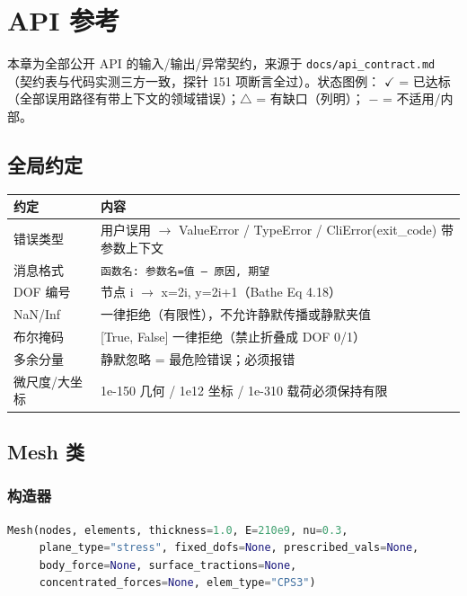 \documentclass[12pt,a4paper]{ctexart}
\newcommand{\fem}{\Verb}
\begin{document}
\section{API 参考}

本章为全部公开 API 的输入/输出/异常契约，来源于 \fem|docs/api_contract.md|
（契约表与代码实测三方一致，探针 151 项断言全过）。状态图例：
$\checkmark$ = 已达标（全部误用路径有带上下文的领域错误）；$\triangle$ = 有缺口（列明）；
$-$ = 不适用/内部。

\subsection{全局约定}

\begin{longtable}{p{3.0cm}p{11.8cm}}
\toprule
\textbf{约定} & \textbf{内容} \\
\midrule
错误类型 & 用户误用 $\to$ ValueError / TypeError / CliError(exit\_code) 带参数上下文 \\
消息格式 & \fem|函数名: 参数名=值 — 原因, 期望| \\
DOF 编号 & 节点 i $\to$ x=2i, y=2i+1（Bathe Eq 4.18） \\
NaN/Inf & 一律拒绝（有限性），不允许静默传播或静默夹值 \\
布尔掩码 & [True, False] 一律拒绝（禁止折叠成 DOF 0/1） \\
多余分量 & 静默忽略 = 最危险错误；必须报错 \\
微尺度/大坐标 & 1e-150 几何 / 1e12 坐标 / 1e-310 载荷必须保持有限 \\
\bottomrule
\end{longtable}

\subsection{Mesh 类}

\subsubsection{构造器}

\begin{lstlisting}[language=python]
Mesh(nodes, elements, thickness=1.0, E=210e9, nu=0.3,
     plane_type="stress", fixed_dofs=None, prescribed_vals=None,
     body_force=None, surface_tractions=None,
     concentrated_forces=None, elem_type="CPS3")
\end{lstlisting}
\end{document}
